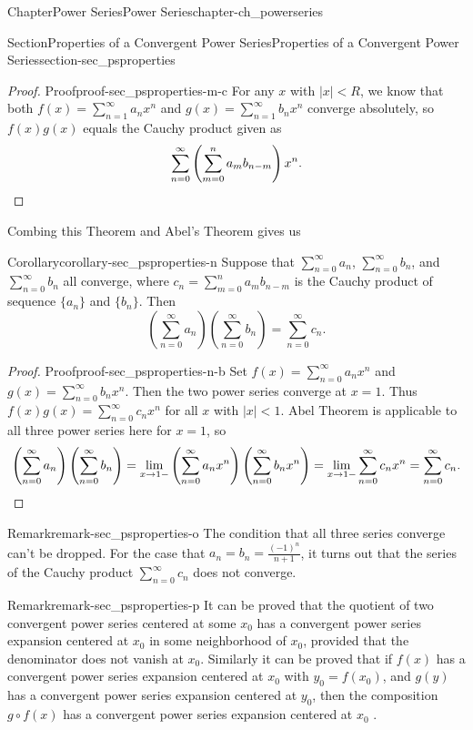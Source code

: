 \documentclass[oneside,10pt,]{book}
\numberwithin{equation}{section}
\newcommand{\qedhere}{\relax}
\newcommand{\lt}{<}
\begin{document}
\begin{chapterptx}{Chapter}{Power Series}{}{Power Series}{}{}{chapter-ch_powerseries}
\begin{sectionptx}{Section}{Properties of a Convergent Power Series}{}{Properties of a Convergent Power Series}{}{}{section-sec_psproperties}
\begin{proof}{Proof}{}{proof-sec_psproperties-m-c}
For any \(x\) with \(|x|\lt R\), we know that both \(f(x)=\sum_{n=1}^{\infty} a_{n} x^{n}\) and \(g(x)=\sum_{n=1}^{\infty} b_{n} x^{n}\) converge absolutely, so \(f(x)g(x)\) equals the Cauchy product given as%
\begin{equation*}
\sum_{n=0}^{\infty} \left( \sum_{m=0}^{n} a_{m}b_{n-m}\right) x^{n}.\qedhere
\end{equation*}
\end{proof}
 Combing this Theorem and Abel's Theorem gives us \begin{corollary}{Corollary}{}{}{corollary-sec_psproperties-n}%
Suppose that \(\sum_{n=0}^{\infty} a_{n} \), \(\sum_{n=0}^{\infty} b_{n} \), and \(\sum_{n=0}^{\infty} b_{n} \) all converge, where \(c_{n} =\sum_{m=0}^{n} a_{m}b_{n-m}\) is  the Cauchy product of sequence \(\{a_{n}\}\) and \(\{b_{n}\}\). Then%
\begin{equation*}
\left(\sum_{n=0}^{\infty} a_{n} \right)\left( \sum_{n=0}^{\infty} b_{n} \right)=\sum_{n=0}^{\infty} c_{n}.
\end{equation*}
\end{corollary}
\begin{proof}{Proof}{}{proof-sec_psproperties-n-b}
Set \(f(x)=\sum_{n=0}^{\infty} a_{n} x^{n}\) and \(g(x)=\sum_{n=0}^{\infty} b_{n} x^{n}\). Then the two power series converge at \(x=1\). Thus \(f(x)g(x)= \sum_{n=0}^{\infty} c_{n} x^{n}\) for all \(x\) with \(|x|\lt 1\). Abel Theorem is applicable to all three power series here for \(x=1\), so%
\begin{equation*}
\left(\sum_{n=0}^{\infty} a_{n} \right)\left( \sum_{n=0}^{\infty} b_{n} \right)
=\lim_{x\to 1-} \left(\sum_{n=0}^{\infty} a_{n} x^{n}\right)\left( \sum_{n=0}^{\infty} b_{n} x^{n}\right)
=\lim_{x\to 1-} \sum_{n=0}^{\infty} c_{n} x^{n}= \sum_{n=0}^{\infty} c_{n}.\qedhere
\end{equation*}
\end{proof}
\begin{remark}{Remark}{}{remark-sec_psproperties-o}%
The condition that all three series converge can't be  dropped. For the case that \(a_{n}=b_{n}=\frac{(-1)^{n}}{n+1}\), it turns out that the series of the Cauchy product \(\sum_{n=0}^{\infty} c_{n}\) does not converge.\end{remark}
\begin{remark}{Remark}{}{remark-sec_psproperties-p}%
It can be proved that the quotient of two convergent power series centered at some \(x_{0}\) has a convergent power series expansion centered at \(x_{0}\) in some neighborhood of \(x_{0}\), provided that the denominator does not vanish at \(x_{0}\). Similarly it can be proved that if \(f(x)\) has a convergent power series expansion centered at \(x_{0}\) with \(y_{0}=f(x_{0})\), and \(g(y)\) has a convergent power series expansion centered at \(y_{0}\), then the composition \(g\circ f (x)\) has a convergent power series expansion centered at \(x_{0}\) .\end{remark}

\end{sectionptx}
\end{chapterptx}
\end{document}

